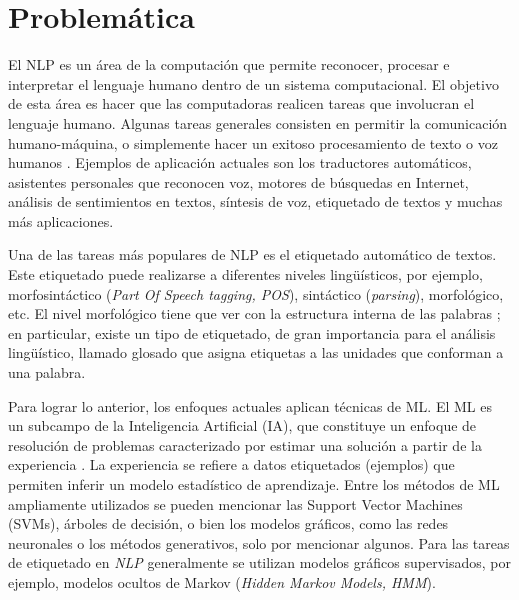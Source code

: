 \documentclass[letterpaper,12pt,oneside]{book}
\theoremstyle{definition}
\begin{document}

\section{Problemática}

El NLP es un área de la computación que permite reconocer, procesar e interpretar el lenguaje humano dentro de un sistema computacional. El objetivo de esta área es hacer que las computadoras realicen tareas que involucran el lenguaje humano. Algunas tareas generales consisten en permitir la comunicación humano-máquina, o simplemente hacer un exitoso procesamiento de texto o voz humanos \citep{jurafsky2008speech}. Ejemplos de aplicación actuales son los traductores automáticos, asistentes personales que reconocen voz, motores de búsquedas en Internet, análisis de sentimientos en textos,  síntesis de voz, etiquetado de textos y muchas más aplicaciones.

Una de las tareas más populares de NLP es el etiquetado automático de textos. Este etiquetado puede realizarse a diferentes niveles lingüísticos, por ejemplo, morfosintáctico (\textit{Part Of Speech tagging, POS}), sintáctico (\textit{parsing}), morfológico, etc.  El nivel morfológico tiene que ver con la estructura interna de las palabras \citep{haspelmath2013understanding}; en particular, existe un tipo de etiquetado, de gran importancia para el análisis lingüístico, llamado glosado que asigna etiquetas a las unidades que conforman a una palabra. 

Para lograr lo anterior, los enfoques actuales aplican técnicas de ML. El ML es un subcampo de la Inteligencia Artificial (IA), que constituye un enfoque de resolución de problemas caracterizado por estimar una solución a partir de la experiencia \citep{mitchell1997machine}.  La experiencia se refiere a datos etiquetados (ejemplos) que permiten inferir un modelo estadístico de aprendizaje. Entre los métodos de ML ampliamente utilizados se pueden mencionar las Support Vector Machines (SVMs), árboles de decisión, o bien los modelos gráficos, como las redes neuronales o los métodos generativos, solo por mencionar algunos. Para las tareas de etiquetado en \textit{NLP} generalmente se utilizan modelos gráficos supervisados, por ejemplo, modelos ocultos de Markov (\textit{Hidden Markov Models, HMM}).
\end{document}
